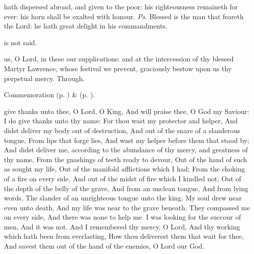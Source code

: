 \clearpage
{}

\introit
{} hath dispersed abroad, and given to the poor: his righteousness remaineth for ever: his horn shall be exalted with honour. \textit{Ps.} Blessed is the man that feareth the Lord: he hath great delight in his commandments.

\begin{rubric}
	 is not said.
\end{rubric}

\collect
{} us, O Lord, in these our supplications: and at the intercession of thy blessed Martyr Lawrence, whose festival we prevent, graciously bestow upon us thy perpetual mercy. Through.

\begin{rubric}
	Commemoration  (p. \pageref{RomanusCollect}) \&  (p. \pageref{SPSaints}).
\end{rubric}

 give thanks unto thee, O Lord, O King, And will praise thee, O God my Saviour: I do give thanks unto thy name: For thou wast my protector and helper, And didst deliver my body out of destruction, And out of the snare of a slanderous tongue, From lips that forge lies, And wast my helper before them that stood by; And didst deliver me, according to the abundance of thy mercy, and greatness of thy name, From the gnashings of teeth ready to devour, Out of the hand of such as sought my life, Out of the manifold afflictions which I had; From the choking of a fire on every side, And out of the midst of fire which I kindled not; Out of the depth of the belly of the grave, And from an unclean tongue, And from lying words, The slander of an unrighteous tongue unto the king. My soul drew near even unto death, And my life was near to the grave beneath. They compassed me on every side, And there was none to help me. I was looking for the succour of men, And it was not. And I remembered thy mercy, O Lord, And thy working which hath been from everlasting, How thou deliverest them that wait for thee, And savest them out of the hand of the enemies, O Lord our God.



